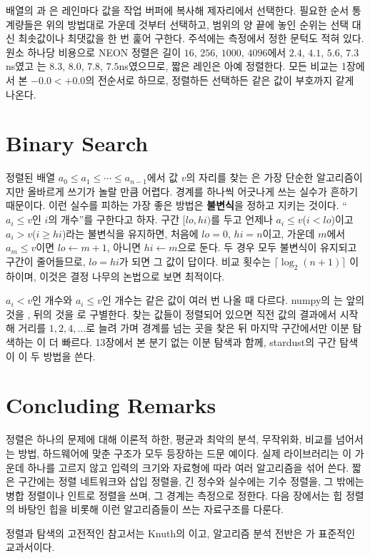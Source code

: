 \begin{instardust}
배열의 과 은 레인마다 값을 작업 버퍼에 복사해 제자리에서 선택한다. 필요한 순서 통계량들은 위의 방법대로 가운데 것부터 선택하고, 범위의 양 끝에 놓인 순위는 선택 대신 최솟값이나 최댓값을 한 번 훑어 구한다. 주석에는 측정에서 정한 문턱도 적혀 있다. 원소 하나당 비용으로 NEON 정렬은 길이 $16$, $256$, $1000$, $4096$에서 $2.4$, $4.1$, $5.6$, $7.3$ns였고 는 $8.3$, $8.0$, $7.8$, $7.5$ns였으므로, 짧은 레인은 아예 정렬한다. 모든 비교는 1장에서 본 $-0.0<+0.0$의 전순서로 하므로, 정렬하든 선택하든 같은 값이 부호까지 같게 나온다.
\end{instardust}

\section{Binary Search}
\label{sec:binary-search}

정렬된 배열 $a_0\le a_1\le\cdots\le a_{n-1}$에서 값 $v$의 자리를 찾는 은 가장 단순한 알고리즘이지만 올바르게 쓰기가 놀랄 만큼 어렵다. 경계를 하나씩 어긋나게 쓰는 실수가 흔하기 때문이다. 이런 실수를 피하는 가장 좋은 방법은 \textbf{불변식}을 정하고 지키는 것이다. ``$a_i\le v$인 $i$의 개수''를 구한다고 하자. 구간 $[lo,hi)$를 두고 언제나 $a_i\le v$($i<lo$)이고 $a_i>v$($i\ge hi$)라는 불변식을 유지하면, 처음에 $lo=0$, $hi=n$이고, 가운데 $m$에서 $a_m\le v$이면 $lo\gets m+1$, 아니면 $hi\gets m$으로 둔다. 두 경우 모두 불변식이 유지되고 구간이 줄어들므로, $lo=hi$가 되면 그 값이 답이다. 비교 횟수는 $\lceil\log_2(n+1)\rceil$ 이하이며, 이것은 결정 나무의 논법으로 보면 최적이다.

$a_i<v$인 개수와 $a_i\le v$인 개수는 같은 값이 여러 번 나올 때 다르다. numpy의 는 앞의 것을 , 뒤의 것을 로 구별한다. 찾는 값들이 정렬되어 있으면 직전 값의 결과에서 시작해 거리를 $1,2,4,\dots$로 늘려 가며 경계를 넘는 곳을 찾은 뒤 마지막 구간에서만 이분 탐색하는 이 더 빠르다. 13장에서 본 분기 없는 이분 탐색과 함께, stardust의 구간 탐색이 이 두 방법을 쓴다.

\section{Concluding Remarks}

정렬은 하나의 문제에 대해 이론적 하한, 평균과 최악의 분석, 무작위화, 비교를 넘어서는 방법, 하드웨어에 맞춘 구조가 모두 등장하는 드문 예이다. 실제 라이브러리는 이 가운데 하나를 고르지 않고 입력의 크기와 자료형에 따라 여러 알고리즘을 섞어 쓴다. 짧은 구간에는 정렬 네트워크와 삽입 정렬을, 긴 정수와 실수에는 기수 정렬을, 그 밖에는 병합 정렬이나 인트로 정렬을 쓰며, 그 경계는 측정으로 정한다. 다음 장에서는 힙 정렬의 바탕인 힙을 비롯해 이런 알고리즘들이 쓰는 자료구조를 다룬다.

정렬과 탐색의 고전적인 참고서는 Knuth의 \cite{knuth1998taocp3}이고, 알고리즘 분석 전반은 \cite{cormen2022clrs}가 표준적인 교과서이다.

\chapterreferences
